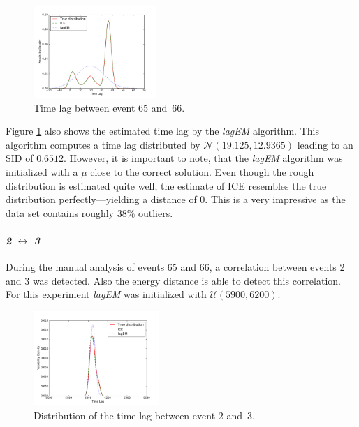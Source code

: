 \documentclass[conference]{IEEEtran}
\theoremstyle{examplestyle}
\newcommand\imgsize{0.415}
\begin{document}
\begin{figure}[!tb]
	\centering
	\includegraphics[width=\imgsize\textwidth]{images/symantec/66-65.pdf}
	\caption{Time lag between event 65 and~66.}
	\label{fig:66-65}
\end{figure}

Figure \ref{fig:66-65} also shows the estimated time lag by the \textit{lagEM} algorithm. This algorithm computes a time lag distributed by \(\mathcal{N}(19.125, 12.9365)\) leading to an \ac{SID} of $0.6512$. However, it is important to note, that the \textit{lagEM} algorithm was initialized with a \(\mu\) close to the correct solution. Even though the rough distribution is estimated quite well, the estimate of \ac{ICE} resembles the true distribution perfectly---yielding a distance of $0$. This is a very impressive as the data set contains roughly 38\% outliers.



\paragraph{\textit{2} \(\leftrightarrow\) \textit{3}} During the manual analysis of events 65 and 66, a correlation between events 2 and 3 was detected. Also the energy distance is able to detect this correlation. For this experiment \textit{lagEM} was initialized with \(\mathcal{U}(5900, 6200)\).

\begin{figure}[!tb]
	\centering
	\includegraphics[width=0.425\textwidth]{images/symantec/2-3.pdf}
	\caption{Distribution of the time lag between event 2 and~3.}
	\label{fig:2-3}
\end{figure}
\end{document}
